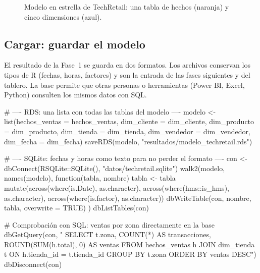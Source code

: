 \begin{figure}[H]
\caption{Modelo en estrella de TechRetail: una tabla de hechos (naranja) y
cinco dimensiones (azul).}
\label{fig:m09-estrella}
\end{figure}

\subsection{Cargar: guardar el modelo}

El resultado de la Fase~1 se guarda en dos formatos. Los archivos
 conservan los tipos de R (fechas, horas, factores) y son la
entrada de las fases siguientes y del tablero. La base 
permite que otras personas o herramientas (Power BI, Excel, Python) consulten
los mismos datos con SQL.

\begin{rcode}
# ---- RDS: una lista con todas las tablas del modelo ----
modelo <- list(hechos_ventas = hechos_ventas,
               dim_cliente   = dim_cliente,
               dim_producto  = dim_producto,
               dim_tienda    = dim_tienda,
               dim_vendedor  = dim_vendedor,
               dim_fecha     = dim_fecha)
saveRDS(modelo, "resultados/modelo_techretail.rds")

# ---- SQLite: fechas y horas como texto para no perder el formato ----
con <- dbConnect(RSQLite::SQLite(), "datos/techretail.sqlite")
walk2(modelo, names(modelo), function(tabla, nombre) {
  tabla <- tabla %
    mutate(across(where(is.Date), as.character),
           across(where(hms::is_hms), as.character),
           across(where(is.factor), as.character))
  dbWriteTable(con, nombre, tabla, overwrite = TRUE)
})
dbListTables(con)

# Comprobación con SQL: ventas por zona directamente en la base
dbGetQuery(con, "
  SELECT t.zona, COUNT(*) AS transacciones,
         ROUND(SUM(h.total), 0) AS ventas
  FROM hechos_ventas h
  JOIN dim_tienda t ON h.tienda_id = t.tienda_id
  GROUP BY t.zona
  ORDER BY ventas DESC")
dbDisconnect(con)
\end{rcode}

